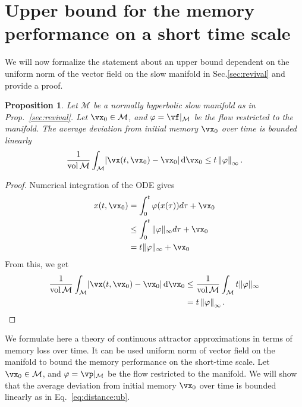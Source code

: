 \documentclass{article} %
\newcounter{ct}
\newcommand{\dm}[1]{\ensuremath{\mathrm{d}{#1}}} %
\newcommand{\manifold}{\mathcal{M}}
\newcommand{\uniformNorm}[1]{\left\|#1\right\|_\infty} %
\DeclarePairedDelimiter{\abs}{\lvert}{\rvert}
\newtheorem{prop}{Proposition}
\theoremstyle{definition}
\theoremstyle{remark}
\begin{document}
\newpage
\section{Upper bound for the memory performance on a short time scale}\label{sec:supp:ub}
We will now formalize the statement about an upper bound dependent on the uniform norm of the vector field on the slow manifold in Sec.\ref{sec:revival} and provide a proof.
\begin{prop}\label{prop:ub}
Let \(\manifold\) be a normally hyperbolic slow manifold as in Prop.~\ref{sec:revival}.
Let \(\vx_0 \in \manifold\), and \(\varphi = \vf\vert_\manifold\) be the flow restricted to the manifold.
The average deviation from initial memory \(\vx_0\) over time is bounded linearly
\begin{align}
\frac{1}{\operatorname{vol}\manifold}\int_\manifold
\abs{\vx(t, \vx_0) - \vx_0}\,
\dm{\vx_0}
\leq t\uniformNorm{\varphi}.
\end{align}
\end{prop}

\begin{proof}
Numerical integration of the ODE gives
\begin{align*}
x(t,\vx_0) &= \int_0^t\varphi(x(\tau))d\tau + \vx_0 \\
&\leq \int_0^t\|\varphi\|_\infty d\tau + \vx_0 \\
&= t\|\varphi\|_\infty+ \vx_0
\end{align*}
From this, we get
\begin{align*}
\frac{1}{\operatorname{vol}\manifold}\int_\manifold
\abs{\vx(t, \vx_0) - \vx_0}\,
\dm{\vx_0} & \leq \frac{1}{\operatorname{vol}\manifold}\int_\manifold t\|\varphi\|_\infty\\
&= t\uniformNorm{\varphi}.
\end{align*}
\end{proof}



We formulate here a theory of continuous attractor approximations in terms of memory loss over time.
It can be used uniform norm of vector field on the manifold to bound the memory performance on the short-time scale. %
Let \(\vx_0 \in \manifold\), and \(\varphi = \vp\vert_\manifold\) be the flow restricted to the manifold.
We will show that the average deviation from initial memory \(\vx_0\) over time is bounded linearly as in Eq.~\ref{eq:distance:ub}.
\end{document}
